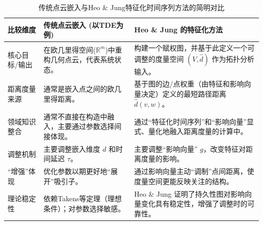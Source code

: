 \begin{table}[htbp]
    \centering
    \caption{传统点云嵌入与Heo \& Jung特征化时间序列方法的简明对比}
    \label{tab:embedding_comparison_concise}
    \begin{tabular}{>{\raggedright\arraybackslash}p{} >{\raggedright\arraybackslash}p{} >{\raggedright\arraybackslash}p{}}
        \toprule
        \textbf{比较维度}                          & \textbf{传统点云嵌入 (以TDE为例)} & \textbf{Heo \& Jung 的特征化方法} \\
        \midrule
        核心目标/输出                                &
        在欧几里得空间($\mathbb{R}^m$)中重构几何点云，代表系统状态。 &
        构建一个赋权图，并基于此定义一个可调整的度量空间 $(V, \hat{d})$ 作为拓扑分析输入。                                               \\
        \addlinespace
        距离度量来源                                 &
        通常是嵌入点之间的欧几里得距离。                       &
        基于图的边/点权重（由特征和影响向量决定）定义的最短路径距离 $\hat{d}(v,w)$。                                                  \\
        \addlinespace
        领域知识整合                                 &
        通常不直接在构造中融入，主要通过参数选择间接体现。              &
        通过“特征化时间序列”和“影响向量”显式、量化地融入距离度量的计算中。                                                             \\
        \addlinespace
        调整机制                                   &
        主要调整嵌入维度 $d$ 和时间延迟 $\tau$。             &
        主要调整“影响向量” $g$，改变特征对距离度量的影响。                                                                    \\
        \addlinespace
        “增强”体现                                 &
        优化参数以期更好地“展开”吸引子。                      &
        通过影响向量主动“调制”点间距离，使度量空间更能反映关注的结构。                                                                \\
        \addlinespace
        理论稳定性                                  &
        依赖Takens等定理（理想条件）；对参数选择敏感。             &
        Heo \& Jung 证明了持久性图对影响向量变化具有稳定性，增强了调整时的可靠性。                                                     \\
        \bottomrule
    \end{tabular}
\end{table}
